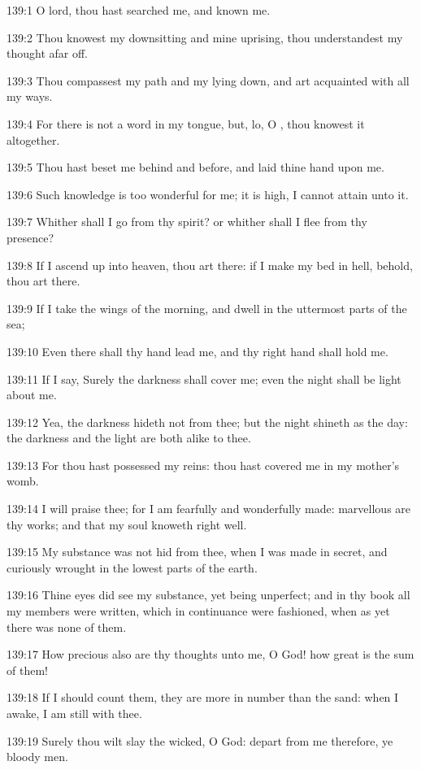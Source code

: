 139:1 O lord, thou hast searched me, and known me.

139:2 Thou knowest my downsitting and mine uprising, thou understandest my thought afar off.

139:3 Thou compassest my path and my lying down, and art acquainted with all my ways.

139:4 For there is not a word in my tongue, but, lo, O \LORD, thou knowest it altogether.

139:5 Thou hast beset me behind and before, and laid thine hand upon me.

139:6 Such knowledge is too wonderful for me; it is high, I cannot attain unto it.

139:7 Whither shall I go from thy spirit? or whither shall I flee from thy presence?

139:8 If I ascend up into heaven, thou art there: if I make my bed in hell, behold, thou art there.

139:9 If I take the wings of the morning, and dwell in the uttermost parts of the sea;

139:10 Even there shall thy hand lead me, and thy right hand shall hold me.

139:11 If I say, Surely the darkness shall cover me; even the night shall be light about me.

139:12 Yea, the darkness hideth not from thee; but the night shineth as the day: the darkness and the light are both alike to thee.

139:13 For thou hast possessed my reins: thou hast covered me in my mother's womb.

139:14 I will praise thee; for I am fearfully and wonderfully made: marvellous are thy works; and that my soul knoweth right well.

139:15 My substance was not hid from thee, when I was made in secret, and curiously wrought in the lowest parts of the earth.

139:16 Thine eyes did see my substance, yet being unperfect; and in thy book all my members were written, which in continuance were fashioned, when as yet there was none of them.

139:17 How precious also are thy thoughts unto me, O God! how great is the sum of them!

139:18 If I should count them, they are more in number than the sand: when I awake, I am still with thee.

139:19 Surely thou wilt slay the wicked, O God: depart from me therefore, ye bloody men.

